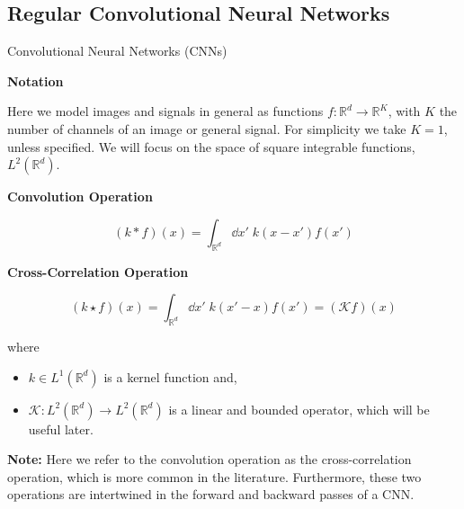 \documentclass[9pt,dvipsnames]{beamer}
\begin{document}
\subsection{Regular Convolutional Neural Networks}
\begin{frame}{Convolutional Neural Networks (CNNs)}

	\textbf{Notation}

	Here we model images and signals in general as functions $f: \mathbb{R}^d \to \mathbb{R}^K$, with $K$ the number of channels of an image or general signal. For simplicity we take $K=1$, unless specified. We will focus on the space of square integrable functions, $L^2(\mathbb{R}^d)$.

	\sectionvspace

	\textbf{Convolution Operation}

	\begin{equation}
		(k * f)(x) = \int_{\mathbb{R}^d} \dd x' \; k(x - x') f(x')
	\end{equation}

	\textbf{Cross-Correlation Operation}

	\begin{equation}
		(k \star f)(x) = \int_{\mathbb{R}^d} \dd x' \; k(x'-x) f(x') = (\mathcal{K} f)(x)
	\end{equation}

	where

	\begin{itemize}
		\item $k \in L^1(\mathbb{R}^d)$ is a kernel function and,
		\item $\mathcal{K}: L^2(\mathbb{R}^d) \to L^2(\mathbb{R}^d)$ is a linear and bounded operator, which will be useful later.
	\end{itemize}

	{\color{red}\textbf{Note:} Here we refer to the convolution operation as the cross-correlation operation, which is more common in the literature. Furthermore, these two operations are intertwined in the forward and backward passes of a CNN.}

\end{frame}

\end{document}
